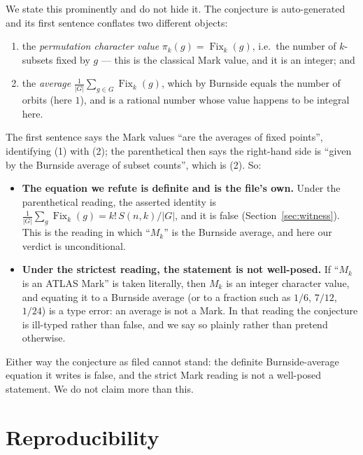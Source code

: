 \documentclass[11pt]{article}
\theoremstyle{definition}
\theoremstyle{remark}
\newcommand{\Fix}{\operatorname{Fix}}
\newcommand{\Stir}[2]{S(#1,#2)}
\begin{document}
We state this prominently and do not hide it. The conjecture is auto-generated
and its first sentence conflates two different objects:
\begin{enumerate}
\item the \emph{permutation character value} $\pi_k(g) = \Fix_k(g)$, i.e.\ the
  number of $k$-subsets fixed by $g$ --- this is the classical Mark value, and
  it is an integer; and
\item the \emph{average} $\frac{1}{|G|}\sum_{g \in G}\Fix_k(g)$, which by
  Burnside equals the number of orbits (here $1$), and is a rational number
  whose value happens to be integral here.
\end{enumerate}
The first sentence says the Mark values ``are the averages of fixed points'',
identifying (1) with (2); the parenthetical then says the right-hand side is
``given by the Burnside average of subset counts'', which is (2). So:
\begin{itemize}
\item \textbf{The equation we refute is definite and is the file's own.} Under
  the parenthetical reading, the asserted identity is
  $\frac{1}{|G|}\sum_g \Fix_k(g) = k!\,\Stir{n}{k}/|G|$, and it is false
  (Section~\ref{sec:witness}). This is the reading in which ``$M_k$'' is the
  Burnside average, and here our verdict is unconditional.
\item \textbf{Under the strictest reading, the statement is not well-posed.}
  If ``$M_k$ is an ATLAS Mark'' is taken literally, then $M_k$ is an integer
  character value, and equating it to a Burnside average (or to a fraction
  such as $1/6$, $7/12$, $1/24$) is a type error: an average is not a Mark.
  In that reading the conjecture is ill-typed rather than false, and we say so
  plainly rather than pretend otherwise.
\end{itemize}
Either way the conjecture as filed cannot stand: the definite Burnside-average
equation it writes is false, and the strict Mark reading is not a well-posed
statement. We do not claim more than this.

\section{Reproducibility}
\end{document}
